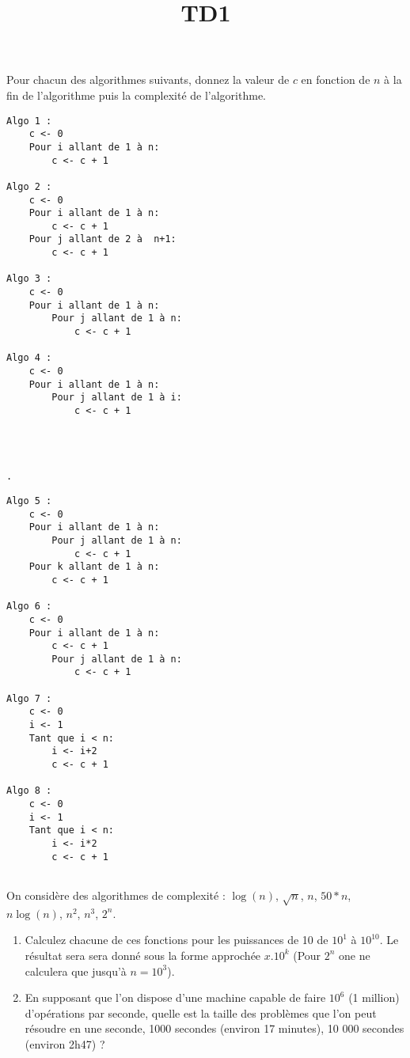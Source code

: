 \documentclass{../cours}
\title{TD1}
\begin{document}
\maketitle

\begin{exercice}
Pour chacun des algorithmes suivants, donnez la valeur de $c$ en fonction de $n$ à la fin de l'algorithme puis la complexité de l'algorithme.

\begin{minipage}[t]{0.48 \textwidth}
\begin{lstlisting}
Algo 1 :
    c <- 0
    Pour i allant de 1 à n:
        c <- c + 1
        
Algo 2 :
    c <- 0
    Pour i allant de 1 à n:
        c <- c + 1
    Pour j allant de 2 à  n+1:
        c <- c + 1
        
Algo 3 :
    c <- 0
    Pour i allant de 1 à n:
        Pour j allant de 1 à n:
            c <- c + 1
            
Algo 4 :
    c <- 0
    Pour i allant de 1 à n:
        Pour j allant de 1 à i:
            c <- c + 1
            
            
            
                       
.
\end{lstlisting}
\end{minipage}
\begin{minipage}[t]{0.48 \textwidth}
\begin{lstlisting}
Algo 5 :
    c <- 0
    Pour i allant de 1 à n:
        Pour j allant de 1 à n:
            c <- c + 1
    Pour k allant de 1 à n:
        c <- c + 1

Algo 6 :
    c <- 0
    Pour i allant de 1 à n:
        c <- c + 1
        Pour j allant de 1 à n:
            c <- c + 1
            
Algo 7 :
    c <- 0
    i <- 1
    Tant que i < n:
        i <- i+2
        c <- c + 1
        
Algo 8 :
    c <- 0
    i <- 1
    Tant que i < n:
        i <- i*2
        c <- c + 1
        
\end{lstlisting}
\end{minipage}
\end{exercice}

\begin{exercice}
On considère des algorithmes de complexité : $\log(n)$, $\sqrt{n}$, $n$, $50*n$, $n\log(n)$, $n^2$, $n^3$, $2^n$.
\begin{enumerate}
\item Calculez chacune de ces fonctions pour les puissances de 10 de $10^1$ à $10^{10}$. Le résultat sera sera donné sous la forme approchée $x.10^k$ (Pour $2^n$ one ne calculera que jusqu'à $n=10^3$).
\item En supposant que l'on dispose d'une machine capable de faire $10^6$ (1 million) d'opérations par seconde, quelle est la taille des problèmes que l'on peut résoudre en une seconde, 1000 secondes (environ 17 minutes), 10 000 secondes (environ 2h47) ?
\end{enumerate}
\end{exercice}
\end{document}
